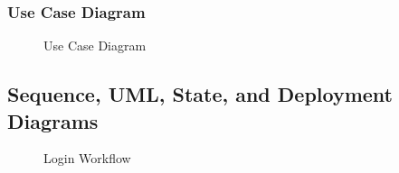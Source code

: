 \documentclass[a4paper, 12pt]{report} %
\begin{document}
        \pagebreak
        \subsubsection{Use Case Diagram}

            \begin{figure}[H]
                \centering
                \caption{Use Case Diagram}
                \label{fig:usecase}
            \end{figure}

    \pagebreak
    \subsection{Sequence, UML, State, and Deployment Diagrams}

        \begin{figure}[H]
            \centering
            \caption{Login Workflow}
            \label{fig:seq_dig_login}
        \end{figure} 
    
\end{document}
